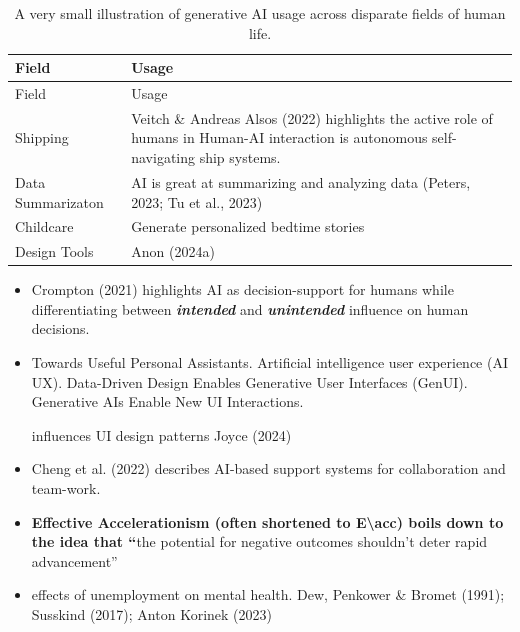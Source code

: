\documentclass[
  letterpaper,
  DIV=11,
  numbers=noendperiod]{scrartcl}
\begin{document}
\begin{longtable}[]{@{}
  >{\raggedright\arraybackslash}p{}
  >{\raggedright\arraybackslash}p{}@{}}
\caption{A very small illustration of generative AI usage across
disparate fields of human life.}\tabularnewline
\toprule\noalign{}
\begin{minipage}[b]{\linewidth}\raggedright
Field
\end{minipage} & \begin{minipage}[b]{\linewidth}\raggedright
Usage
\end{minipage} \\
\midrule\noalign{}
\endfirsthead
\toprule\noalign{}
\begin{minipage}[b]{\linewidth}\raggedright
Field
\end{minipage} & \begin{minipage}[b]{\linewidth}\raggedright
Usage
\end{minipage} \\
\midrule\noalign{}
\endhead
\bottomrule\noalign{}
\endlastfoot
Shipping & Veitch \& Andreas Alsos (2022) highlights the active role of
humans in Human-AI interaction is autonomous self-navigating ship
systems. \\
Data Summarizaton & AI is great at summarizing and analyzing data
(Peters, 2023; Tu et al., 2023) \\
Childcare & Generate personalized bedtime stories \\
Design Tools & Anon (2024a) \\
\end{longtable}

\begin{itemize}
\item
  Crompton (2021) highlights AI as decision-support for humans while
  differentiating between \textbf{\emph{intended}} and
  \textbf{\emph{unintended}} influence on human decisions.
\item
  Towards Useful Personal Assistants. Artificial intelligence user
  experience (AI UX). Data-Driven Design Enables Generative User
  Interfaces (GenUI). Generative AIs Enable New UI Interactions.

  influences UI design patterns Joyce (2024)
\item
  Cheng et al. (2022) describes AI-based support systems for
  collaboration and team-work.
\item
  \textbf{Effective Accelerationism (often shortened to
  E\textbackslash acc) boils down to the idea that ``}the potential for
  negative outcomes shouldn't deter rapid advancement''
\item
  effects of unemployment on mental health. Dew, Penkower \& Bromet
  (1991); Susskind (2017); Anton Korinek (2023)
\end{itemize}
\end{document}
